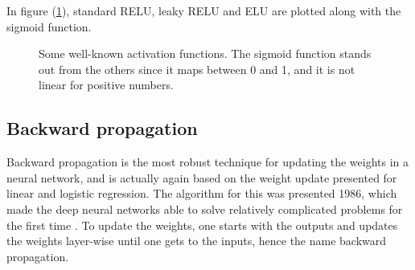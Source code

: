 In figure (\ref{fig:activation_functions}), standard RELU, leaky RELU and ELU are plotted along with the sigmoid function.

\begin{figure}
	\centering
	\caption{Some well-known activation functions. The sigmoid function stands out from the others since it maps between 0 and 1, and it is not linear for positive numbers.}%
	\label{fig:activation_functions}%
\end{figure}


\subsection{Backward propagation} \label{sec:backward}
Backward propagation is the most robust technique for updating the weights in a neural network, and is actually again based on the weight update presented for linear and logistic regression. The algorithm for this was presented 1986, which made the deep neural networks able to solve relatively complicated problems for the first time \cite{rumelhart_learning_1986}. To update the weights, one starts with the outputs and updates the weights layer-wise until one gets to the inputs, hence the name backward propagation. 

